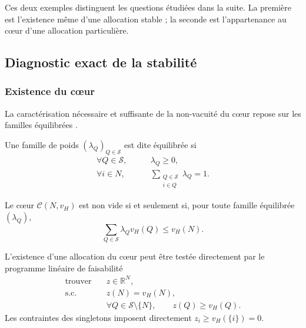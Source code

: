 Ces deux exemples distinguent les questions étudiées dans la suite. La
première est l'existence même d'une allocation stable ; la seconde est
l'appartenance au cœur d'une allocation particulière.

\subsection{Diagnostic exact de la stabilité}
\label{subsubsec:bondareva_shapley}

\subsubsection{Existence du cœur}

La caractérisation nécessaire et suffisante de la non-vacuité du cœur
repose sur les familles équilibrées
\cite{bondareva1963,shapley1967balanced}.

\begin{definition}
Une famille de poids \((\lambda_Q)_{Q\in\mathcal S}\) est dite équilibrée si
\[
\begin{aligned}
    \forall Q\in\mathcal S,\qquad
    &\lambda_Q\geqslant0,\\
    \forall i\in N,\qquad
    &\sum_{\substack{Q\in\mathcal S\\i\in Q}}\lambda_Q=1.
\end{aligned}
\]
\end{definition}

\begin{theorem}
\label{thm:bondareva_shapley}
Le cœur $\mathcal C(N,v_H)$ est non vide si et seulement si, pour toute
famille équilibrée $(\lambda_Q)$,
\[
    \sum_{Q\in\mathcal S}\lambda_Qv_H(Q)
    \leqslant v_H(N).
\]
\end{theorem}

L'existence d'une allocation du cœur peut être testée directement par le
programme linéaire de faisabilité
\begin{equation}
\label{eq:lp_faisabilite_coeur}
\begin{aligned}
\text{trouver}\quad
    & z\in\mathbb R^N,\\
\text{s.c.}\quad
    & z(N)=v_H(N),\\
    & \forall Q\in\mathcal S\setminus\{N\},\qquad
      z(Q)\geqslant v_H(Q).
\end{aligned}
\end{equation}
Les contraintes des singletons imposent directement
\(z_i\geqslant v_H(\{i\})=0\).

